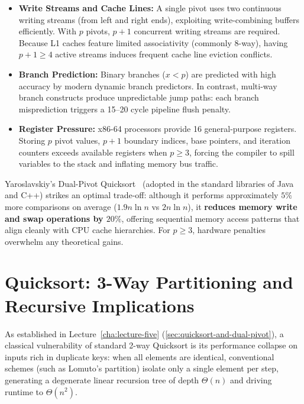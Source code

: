 \begin{itemize}
  \item \textbf{Write Streams and Cache Lines:} A single pivot uses two continuous writing streams (from left and right ends), exploiting write-combining buffers efficiently. With $p$ pivots, $p+1$ concurrent writing streams are required. Because L1 caches feature limited associativity (commonly 8-way), having $p+1 \ge 4$ active streams induces frequent cache line eviction conflicts.
  \item \textbf{Branch Prediction:} Binary branches ($x < p$) are predicted with high accuracy by modern dynamic branch predictors. In contrast, multi-way branch constructs produce unpredictable jump paths: each branch misprediction triggers a 15--20 cycle pipeline flush penalty.
  \item \textbf{Register Pressure:} x86-64 processors provide 16 general-purpose registers. Storing $p$ pivot values, $p+1$ boundary indices, base pointers, and iteration counters exceeds available registers when $p \ge 3$, forcing the compiler to spill variables to the stack and inflating memory bus traffic.
\end{itemize}

\begin{property}[Why Dual-Pivot ($p=2$) Excels in Practice]
Yaroslavskiy's Dual-Pivot Quicksort~\cite{yaroslavskiy2009} (adopted in the standard libraries of Java and C++) strikes an optimal trade-off: although it performs approximately $5\%$ more comparisons on average ($1.9 n \ln n$ vs $2 n \ln n$), it \textbf{reduces memory write and swap operations by $20\%$}, offering sequential memory access patterns that align cleanly with CPU cache hierarchies. For $p \ge 3$, hardware penalties overwhelm any theoretical gains.
\end{property}

\FloatBarrier
\section{Quicksort: 3-Way Partitioning and Recursive Implications}
\label{sec:3way-partitioning}

As established in Lecture~\ref{cha:lecture-five} (\autoref{sec:quicksort-and-dual-pivot}), a classical vulnerability of standard 2-way Quicksort is its performance collapse on inputs rich in duplicate keys: when all elements are identical, conventional schemes (such as Lomuto's partition) isolate only a single element per step, generating a degenerate linear recursion tree of depth $\Theta(n)$ and driving runtime to $\Theta(n^2)$.

